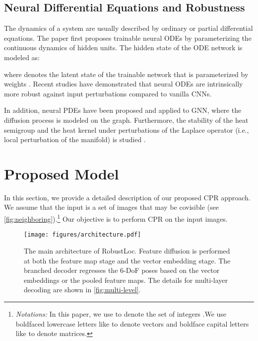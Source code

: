 \documentclass[letterpaper]{article} \usepackage{aaai23}  \usepackage{times}  \usepackage{helvet}  \usepackage{courier}  \usepackage[hyphens]{url}  \usepackage{graphicx} \urlstyle{rm} \def\UrlFont{\rm}  \usepackage{natbib}  \usepackage{caption} \frenchspacing  \setlength{\pdfpagewidth}{8.5in} \setlength{\pdfpageheight}{11in} \usepackage{booktabs}
\theoremstyle{remark}
\theoremstyle{plain}
\begin{document}
\subsection{Neural Differential Equations and Robustness}

The dynamics of a system are usually described by ordinary or partial differential equations. The paper \cite{chen2018neural} first proposes trainable neural ODEs by parameterizing the continuous dynamics of hidden units. The hidden state of the ODE network is modeled as:

where   denotes the latent state of the trainable network  that is parameterized by weights . Recent studies \cite{yan2019robustness,kang2021Neurips} have demonstrated that neural ODEs are intrinsically more robust against input perturbations compared to vanilla CNNs. 



In addition, neural PDEs \cite{chamberlain2021grand, chamberlain2021blend} have been proposed and applied to GNN, where the diffusion process is modeled on the graph. Furthermore, the stability of the heat semigroup and the heat kernel under perturbations of the Laplace operator (i.e., local perturbation of the manifold) is studied \cite{SonKanWan:C22}.



\section{Proposed Model}



In this section, we provide a detailed description of our proposed CPR approach.
We assume that the input is a set of images  that may be covisible (see \cref{fig:neighboring}).\footnote{\emph{Notations:} In this paper, we use  to denote the set of integers .We use boldfaced lowercase letters like  to denote vectors and boldface capital letters like  to denote matrices.} Our objective is to perform CPR on the input images.














\begin{figure*}[ht]
\begin{center}
\texttt{[image: figures/architecture.pdf]}
\end{center}
\caption{The main architecture of RobustLoc. Feature diffusion is performed at both the feature map stage and the vector embedding stage. The branched decoder regresses the 6-DoF poses based on the vector embeddings or the pooled feature maps. The details for multi-layer decoding are shown in \cref{fig:multi-level}. }
\label{fig:model}
\end{figure*}
\end{document}
